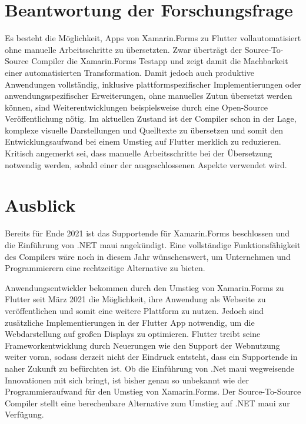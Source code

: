 \section{Beantwortung der Forschungsfrage}
Es besteht die Möglichkeit,  Apps von Xamarin.Forms zu Flutter vollautomatisiert ohne manuelle 
Arbeitsschritte zu übersetzten. Zwar überträgt der Source-To-Source Compiler die Xamarin.Forms Testapp und zeigt damit die Machbarkeit einer automatisierten Transformation.  Damit jedoch auch produktive Anwendungen vollständig, inklusive plattformspezifischer Implementierungen oder anwendungsspezifischer Erweiterungen, ohne manuelles Zutun übersetzt werden können,  sind 
Weiterentwicklungen beispielsweise durch eine Open-Source Veröffentlichung nötig.
Im aktuellen Zustand ist der Compiler schon in der Lage,  komplexe visuelle Darstellungen
und Quelltexte zu übersetzen und somit den Entwicklungsaufwand bei einem Umstieg auf Flutter 
merklich zu reduzieren.
Kritisch angemerkt sei,  dass manuelle Arbeitsschritte bei der Übersetzung notwendig werden,  sobald einer der ausgeschlossenen Aspekte verwendet wird.


\section{Ausblick}
Bereits für Ende 2021 ist das Supportende für Xamarin.Forms beschlossen und die Einführung von 
.NET \ac{maui} angekündigt.  Eine vollständige Funktionsfähigkeit des Compilers wäre noch in diesem Jahr wünschenswert,  um Unternehmen und Programmierern eine rechtzeitige Alternative zu bieten. 

Anwendungsentwickler bekommen durch den Umstieg von Xamarin.Forms zu Flutter seit März 2021 die Möglichkeit,  ihre Anwendung als Webseite zu veröffentlichen und somit eine weitere Plattform zu nutzen.  Jedoch sind zusätzliche Implementierungen in der Flutter App notwendig,  um die Webdarstellung auf großen Displays zu optimieren.  Flutter treibt seine Frameworkentwicklung durch Neuerungen wie den Support der Webnutzung weiter voran,  sodass derzeit nicht der 
Eindruck entsteht, dass ein Supportende in naher Zukunft zu befürchten ist. 
Ob die Einführung von .Net \ac{maui} wegweisende Innovationen mit sich bringt,  ist bisher genau so unbekannt wie der Programmieraufwand für den Umstieg von Xamarin.Forms.  Der Source-To-Source Compiler stellt eine berechenbare Alternative zum Umstieg auf .NET  \ac{maui} zur Verfügung. 
